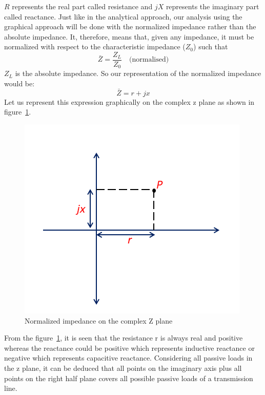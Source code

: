 $R$ represents the real part called resistance and $jX$ represents the imaginary part called reactance. Just like in the analytical approach, our analysis using the graphical approach will be done with the normalized impedance rather than the absolute impedance. It, therefore, means that, given any impedance, it must be normalized with respect to the characteristic impedance ($Z_0$) such that
\begin{equation*}
\bar{Z}=\frac{Z_L}{Z_0} \quad \text{(normalised)}
\end{equation*}
$Z_L$ is the absolute impedance. So our representation of the normalized impedance would be:
\begin{equation*}
\bar{Z}= r + jx
\end{equation*}
Let us represent this expression graphically on the complex z plane as shown in figure~\ref{fig:transline2}.
\begin{figure}[h]
\center\includegraphics[width=0.8\linewidth]{./graphics/Zplane}
\caption{Normalized impedance on the complex Z plane}
\label{fig:transline2}
\end{figure}

From the figure~\ref{fig:transline2}, it is seen that the resistance r is always real and positive whereas the reactance could be positive which represents inductive reactance or negative which represents capacitive reactance. Considering all passive loads in the z plane, it can be deduced that all points on the imaginary axis plus all points on the right half plane covers all possible passive loads of a transmission line.


